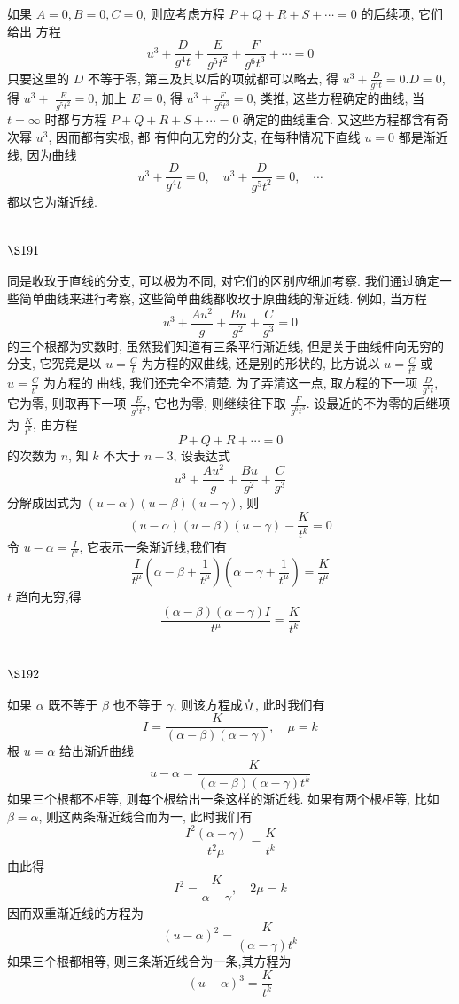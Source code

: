 如果 $A=0, B=0, C=0$, 则应考虑方程 $P+Q+R+S+\cdots=0$ 的后续项, 它们给出 方程
\[
u^{3}+\frac{D}{g^{4} t}+\frac{E}{g^{5} t^{2}}+\frac{F}{g^{6} t^{3}}+\cdots=0
\]
只要这里的 $D$ 不等于零, 第三及其以后的项就都可以略去, 得 $u^{3}+\frac{D}{g^{4} t}=0 . D=0$, 得 $u^{3}+$ $\frac{E}{g^{5} t^{2}}=0$, 加上 $E=0$, 得 $u^{3}+\frac{F}{g^{6} t^{3}}=0$, 类推, 这些方程确定的曲线, 当 $t=\infty$ 时都与方程 $P+Q+R+S+\cdots=0$ 确定的曲线重合. 又这些方程都含有奇次幂 $u^{3}$, 因而都有实根, 都 有伸向无穷的分支, 在每种情况下直线 $u=0$ 都是渐近线, 因为曲线
\[
u^{3}+\frac{D}{g^{4} t}=0, \quad u^{3}+\frac{D}{g^{5} t^{2}}=0, \quad \cdots
\]
都以它为渐近线.

\section{$\S 191$}

同是收玫于直线的分支, 可以极为不同, 对它们的区别应细加考察. 我们通过确定一 些简单曲线来进行考察, 这些简单曲线都收玫于原曲线的渐近线. 例如, 当方程
\[
u^{3}+\frac{A u^{2}}{g}+\frac{B u}{g^{2}}+\frac{C}{g^{3}}=0
\]
的三个根都为实数时, 虽然我们知道有三条平行渐近线, 但是关于曲线伸向无穷的分支, 它究竟是以 $u=\frac{C}{t}$ 为方程的双曲线, 还是别的形状的, 比方说以 $u=\frac{C}{t^{2}}$ 或 $u=\frac{C}{t^{3}}$ 为方程的 曲线, 我们还完全不清楚. 为了弄清这一点, 取方程的下一项 $\frac{D}{g^{4} t}$, 它为零, 则取再下一项 $\frac{E}{g^{5} t^{2}}$, 它也为零, 则继续往下取 $\frac{F}{g^{6} t^{3}}$. 设最近的不为零的后继项为 $\frac{K}{t^{k}}$, 由方程
\[
P+Q+R+\cdots=0
\]
的次数为 $n$, 知 $k$ 不大于 $n-3$, 设表达式
\[
u^{3}+\frac{A u^{2}}{g}+\frac{B u}{g^{2}}+\frac{C}{g^{3}}
\]
分解成因式为 $(u-\alpha)(u-\beta)(u-\gamma)$, 则
\[
(u-\alpha)(u-\beta)(u-\gamma)-\frac{K}{t^{k}}=0
\]
令 $u-\alpha=\frac{I}{t^{u}}$, 它表示一条渐近线,我们有
\[
\frac{I}{t^{\mu}}\left(\alpha-\beta+\frac{1}{t^{\mu}}\right)\left(\alpha-\gamma+\frac{1}{t^{\mu}}\right)=\frac{K}{t^{\mu}}
\]
$t$ 趋向无穷,得
\[
\frac{(\alpha-\beta)(\alpha-\gamma) I}{t^{\mu}}=\frac{K}{t^{k}}
\]
\section{$\S 192$}

如果 $\alpha$ 既不等于 $\beta$ 也不等于 $\gamma$, 则该方程成立, 此时我们有
\[
I=\frac{K}{(\alpha-\beta)(\alpha-\gamma)}, \quad \mu=k
\]
根 $u=\alpha$ 给出渐近曲线
\[
u-\alpha=\frac{K}{(\alpha-\beta)(\alpha-\gamma) t^{k}}
\]
如果三个根都不相等, 则每个根给出一条这样的渐近线. 如果有两个根相等, 比如 $\beta=\alpha$, 则这两条渐近线合而为一, 此时我们有
\[
\frac{I^{2}(\alpha-\gamma)}{t^{2} \mu}=\frac{K}{t^{k}}
\]
由此得
\[
I^{2}=\frac{K}{\alpha-\gamma}, \quad 2 \mu=k
\]
因而双重渐近线的方程为
\[
(u-\alpha)^{2}=\frac{K}{(\alpha-\gamma) t^{k}}
\]
如果三个根都相等, 则三条渐近线合为一条,其方程为
\[
(u-\alpha)^{3}=\frac{K}{t^{k}}
\]
